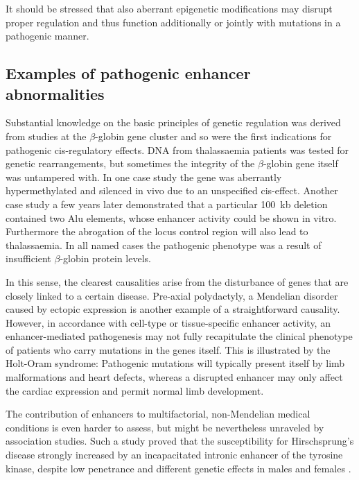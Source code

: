 It should be stressed that also aberrant epigenetic modifications may disrupt proper regulation and thus function additionally or jointly with mutations in a pathogenic manner\cite{Planello2016}.

\subsection{Examples of pathogenic enhancer abnormalities}
\label{chap:i:enhancers:pathogenicabnorm}

Substantial knowledge on the basic principles of genetic regulation was derived from studies at the \ensuremath{\beta}-globin gene cluster and so were the first indications for pathogenic cis-regulatory effects. DNA from thalassaemia patients was tested for genetic rearrangements, but sometimes the integrity of the \ensuremath{\beta}-globin gene itself was untampered with. In one case study the gene was aberrantly hypermethylated and silenced in vivo due to an unspecified cis-effect\cite{Kioussis1983}. Another case study a few years later demonstrated that a particular \SI{100}{kb} deletion contained two Alu elements\cite{Taramelli1986}, whose enhancer activity could be shown in vitro. Furthermore the abrogation of the locus control region will also lead to thalassaemia\cite{Harteveld2005}. In all named cases the pathogenic phenotype was a result of insufficient \ensuremath{\beta}-globin protein levels. 

In this sense, the clearest causalities arise from the disturbance of genes that are closely linked to a certain disease. Pre-axial polydactyly, a Mendelian disorder caused by ectopic  expression\cite{Lettice2003} is another example of a straightforward causality. However, in accordance with cell-type or tissue-specific enhancer activity, an enhancer-mediated pathogenesis may not fully recapitulate the clinical phenotype of patients who carry mutations in the genes itself. This is illustrated by the Holt-Oram syndrome: Pathogenic  mutations will typically present itself by limb malformations and heart defects, whereas a disrupted enhancer may only affect the cardiac expression and permit normal limb development\cite{Smemo2012}.

The contribution of enhancers to multifactorial, non-Mendelian medical conditions is even harder to assess, but might be nevertheless unraveled by association studies. Such a study proved that the susceptibility for Hirschsprung’s disease strongly increased by an incapacitated intronic enhancer of the  tyrosine kinase, despite low penetrance and different genetic effects in males and females \cite{Emison2005}. 

